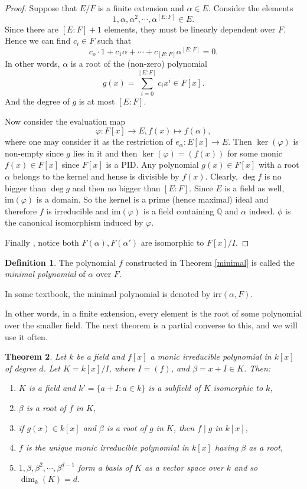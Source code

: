 \documentclass[12pt]{report}
\newtheorem{thm}{Theorem}[section]
\theoremstyle{definition}
\newtheorem{defn}[thm]{Definition}
\def\QQ{\mathbb{Q}}
\def\im{\text{im}}
\def\aa{\alpha}
\begin{document}
\begin{proof}
    Suppose that $E/F$ is a finite extension and $\aa\in E$. Consider the elements $$1,\aa,\aa^2,\cdots,\aa^{[E:F]}\in E.$$
    Since there are $[E:F]+1$ elements, they must be linearly dependent over $F$. Hence we can find $c_i\in F$ such that $$c_o\cdot 1+c_1\aa+\cdots+c_{[E:F]}\aa^{[E:F]} =0.$$  In other words, $\aa$ is a root of the (non-zero) polynomial $$g(x)=\sum_{i=0}^{[E:F]}c_i x^i \in F[x].$$ And the degree of $g$ is at most $[E:F]$.

    Now consider the evaluation map $$\varphi: F[x]\to E, f(x)\mapsto f(\aa),$$ where one may consider it as the restriction of $e_\aa: E[x]\to E$. Then $\ker(\varphi)$ is non-empty since $g$ lies in it and then $\ker(\varphi)=(f(x))$ for some monic $f(x)\in F[x]$ since $F[x]$ is a PID. Any polynomial $g(x)\in F[x]$ with a root $\aa$ belongs to the kernel and hense is divisible by $f(x)$. Clearly, $\deg f$ is no bigger than $\deg g$ and then no bigger than $[E:F]$. Since $E$ is a field as well, $\im(\varphi)$ is a domain. So the kernel is a prime (hence maximal) ideal and therefore $f$ is irreducible and $\im(\varphi)$ is a field containing $\QQ$ and $\aa$ indeed. $\phi$ is the canonical isomorphism  induced by $\varphi$. 

    Finally , notice both $F(\aa), F(\aa')$ are isomorphic to $F[x]/I$.
\end{proof}

\begin{defn}
    The polynomial $f$ constructed in Theorem \ref{minimal} is called the \emph{minimal polynomial} of $\aa$ over $F$.
\end{defn}

\begin{remark}
    In some textbook, the minimal polynomial is denoted by $\mbox{irr}(\aa,F)$.
\end{remark}

In other words, in a finite extension, every element is the root of some polynomial over the smaller field. The next theorem is a partial converse to this, and we will use it often.

\begin{thm}\label{stem}
    Let $k$ be a field and $f[x]$ a monic irreducible polynomial in $k[x]$ of degree $d$. Let $K=k[x]/I$, where $I=(f)$, and $\beta = x+I\in K$. Then:
    \begin{enumerate}
        \item $K$ is a field and $k'=\{a+I: a\in k\}$ is a subfield of $K$ isomorphic to $k$,
        \item $\beta$ is a root of $f$ in $K$,
        \item if $g(x)\in k[x]$ and $\beta$ is a root of $g$ in $K$, then $f\mid g$ in $k[x]$,
        \item $f$ is the unique monic irreducible polynomial in $k[x]$ having $\beta$ as a root,
        \item $1,\beta,\beta^2,\cdots,\beta^{d-1}$ form a basis of $K$ as a vector space over $k$ and so $\dim_k(K)=d$.
    \end{enumerate}
\end{thm}
\end{document}
